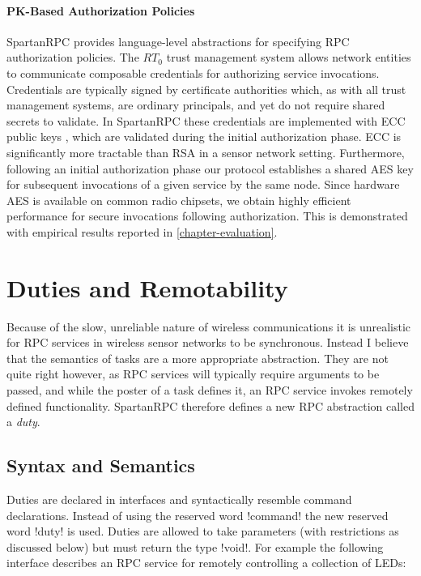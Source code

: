 \paragraph{PK-Based Authorization Policies} SpartanRPC provides language-level abstractions for
specifying RPC authorization policies. The $RT_0$ trust management system allows network
entities to communicate composable credentials for authorizing service invocations. Credentials
are typically signed by certificate authorities which, as with all trust management systems, are
ordinary principals, and yet do not require shared secrets to validate. In SpartanRPC these
credentials are implemented with ECC public keys \cite{bertoni-2006}, which are validated during
the initial authorization phase. ECC is significantly more tractable than RSA in a sensor
network setting. Furthermore, following an initial authorization phase our protocol establishes
a shared AES key for subsequent invocations of a given service by the same node. Since hardware
AES is available on common radio chipsets, we obtain highly efficient performance for secure
invocations following authorization. This is demonstrated with empirical results reported in
\autoref{chapter-evaluation}.

\section{Duties and Remotability}
\label{section-duties}

Because of the slow, unreliable nature of wireless communications it is unrealistic for RPC
services in wireless sensor networks to be synchronous. Instead I believe that the semantics of
tasks are a more appropriate abstraction. They are not quite right however, as RPC services will
typically require arguments to be passed, and while the poster of a task defines it, an RPC
service invokes remotely defined functionality. SpartanRPC therefore defines a new RPC
abstraction called a \emph{duty}.

\subsection{Syntax and Semantics}
\label{section-duties-syntax}

Duties are declared in interfaces and syntactically resemble command declarations. Instead of
using the reserved word !command! the new reserved word !duty! is used. Duties are allowed to
take parameters (with restrictions as discussed below) but must return the type !void!. For
example the following interface describes an RPC service for remotely controlling a collection
of LEDs:

